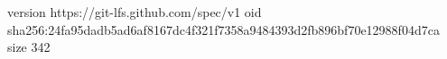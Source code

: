 version https://git-lfs.github.com/spec/v1
oid sha256:24fa95dadb5ad6af8167dc4f321f7358a9484393d2fb896bf70e12988f04d7ca
size 342

